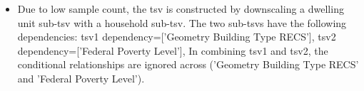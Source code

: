 \begin{itemize}
\item Due to low sample count, the tsv is constructed by downscaling a dwelling unit sub-tsv with a household sub-tsv. The two sub-tsvs have the following dependencies: tsv1 dependency=['Geometry Building Type RECS'], tsv2 dependency=['Federal Poverty Level'], In combining tsv1 and tsv2, the conditional relationships are ignored across ('Geometry Building Type RECS' and 'Federal Poverty Level').
\end{itemize}
